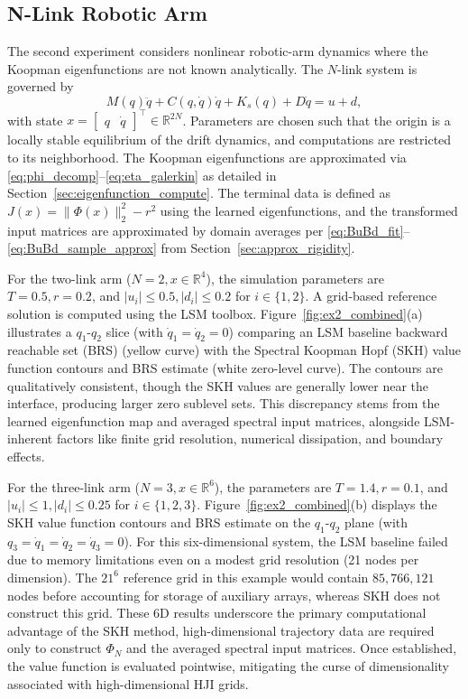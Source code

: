 \documentclass[letterpaper, 10 pt, conference]{ieeeconf}
\theoremstyle{plain}
\theoremstyle{definition}
\begin{document}
\subsection{N-Link Robotic Arm}
\label{sec:nlink_arm}

The second experiment considers nonlinear robotic-arm dynamics where the Koopman eigenfunctions are not known analytically. The $N$-link system is governed by
\begin{equation}
    M(q)\ddot q+C(q,\dot q)\dot q+K_s(q)+D\dot q=u+d,
\end{equation}
with state $x = \begin{bmatrix} q & \dot q \end{bmatrix}^\top \in \mathbb{R}^{2N}$. Parameters are chosen such that the origin is a locally stable equilibrium of the drift dynamics, and computations are restricted to its neighborhood. 
The Koopman eigenfunctions are approximated via \eqref{eq:phi_decomp}--\eqref{eq:eta_galerkin} as detailed in Section~\ref{sec:eigenfunction_compute}. The terminal data is defined as $J(x)=\|\Phi(x)\|_2^2-r^2$ using the learned eigenfunctions, and the transformed input matrices are approximated by domain averages per \eqref{eq:BuBd_fit}--\eqref{eq:BuBd_sample_approx} from Section~\ref{sec:approx_rigidity}.

For the two-link arm ($N=2, x \in \mathbb{R}^4$), the simulation parameters are $T=0.5, r=0.2$, and $|u_{i}| \le 0.5, |d_{i}| \le 0.2$ for $i \in \{1,2\}$. A grid-based reference solution is computed using the LSM toolbox. Figure~\ref{fig:ex2_combined}(a) illustrates a $q_1$-$q_2$ slice (with $\dot q_1=\dot q_2=0$) comparing an LSM baseline backward reachable set (BRS) (yellow curve) with the Spectral Koopman Hopf (SKH) value function contours and BRS estimate (white zero-level curve). The contours are qualitatively consistent, though the SKH values are generally lower near the interface, producing larger zero sublevel sets. This discrepancy stems from the learned eigenfunction map and averaged spectral input matrices, alongside LSM-inherent factors like finite grid resolution, numerical dissipation, and boundary effects.

For the three-link arm ($N=3, x \in \mathbb{R}^6$), the parameters are $T=1.4, r=0.1$, and $|u_{i}| \le 1, |d_{i}| \le 0.25$ for $i \in \{1,2,3\}$. 
Figure~\ref{fig:ex2_combined}(b) displays the SKH value function contours and BRS estimate on the $q_1$-$q_2$ plane (with $q_3=\dot q_1=\dot q_2=\dot q_3=0$). For this six-dimensional system, the LSM baseline failed due to memory limitations even on a modest grid resolution (21 nodes per dimension). 
The $21^6$ reference grid in this example would contain $85,766,121$ nodes before accounting for storage of auxiliary arrays, whereas SKH does not construct this grid.
These 6D results underscore the primary computational advantage of the SKH method, high-dimensional trajectory data are required only to construct $\Phi_N$ and the averaged spectral input matrices. Once established, the value function is evaluated pointwise, mitigating the curse of dimensionality associated with high-dimensional HJI grids.
\end{document}
